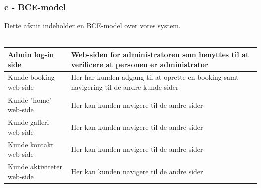 \documentclass[12pt,a4paper]{article}
\begin{document}
\subsubsection{e - BCE-model}
Dette afsnit indeholder en BCE-model over vores system.\\\\
\begin{minipage}{\textwidth}

 \label{tab:title}
\begin{tabular}{| p{5cm} | p{10cm} |}
\hline Admin log-in side & Web-siden for administratoren som benyttes til at verificere at personen er administrator \\
\hline Kunde booking web-side & Her har kunden adgang til at oprette en booking samt navigering til de andre kunde sider \\
\hline Kunde "home" web-side & Her kan kunden navigere til de andre sider \\
\hline Kunde galleri web-side & Her kan kunden navigere til de andre sider \\
\hline Kunde kontakt web-side & Her kan kunden navigere til de andre sider \\
\hline Kunde aktiviteter web-side & Her kan kunden navigere til de andre sider \\
\hline
\end{tabular}

\end{minipage}

\bigskip
\end{document}
